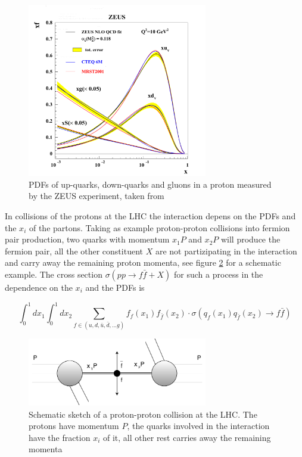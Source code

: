 \begin{figure}[ht]
	\centering
	\includegraphics[width=0.7\textwidth]{pictures/ZEUS_PDF.pdf}

	\caption[Proton \acsp{PDF} from ZEUS]{\acsp{PDF} of up-quarks, down-quarks and gluons in a proton measured by the ZEUS experiment, taken from \cite{PDFMEAS}}
	\label{fig:fig_2_3}
\end{figure}

In collisions of the protons at the \acs{LHC} the interaction depens on the \acsp{PDF} and the $x_{i}$ of the partons. Taking as example proton-proton collisions into fermion pair production, two quarks with momentum $x_{1}P$ and $x_{2}P$ will produce the fermion pair, all the other constituent $X$ are not partizipating in the interaction and carry away the remaining proton momenta, see figure \ref{fig:fig_2_4} for a schematic example. The cross section $\sigma(pp\to f\bar{f} + X)$ \cite{Peskin} for such a process in the dependence on the $x_{i}$ and the \acsp{PDF} is 

\begin{equation}
	\label{eq:eq_2_3}
	\int_{0}^{1}dx_{1}\int_{0}^{1}dx_{2}\sum_{f \in (u, d, \bar{u}, \bar{d}, ... g)} f_{f}(x_{1})f_{\bar{f}}(x_{2}) \cdot \sigma(q_{f}(x_{1})q_{\bar{f}}(x_{2}) \to f\bar{f}) 
\end{equation}


\begin{figure}[ht]
	\centering
	\includegraphics[width=0.7\textwidth]{pictures/ppcollision.pdf}

	\caption[Schematic sketch of proton-proton collision]{Schematic sketch of a proton-proton collision at the \acs{LHC}. The protons have momentum $P$, the quarks involved in the interaction have the fraction $x_{i}$ of it, all other rest carries away the remaining momenta}
	\label{fig:fig_2_4}
\end{figure}


